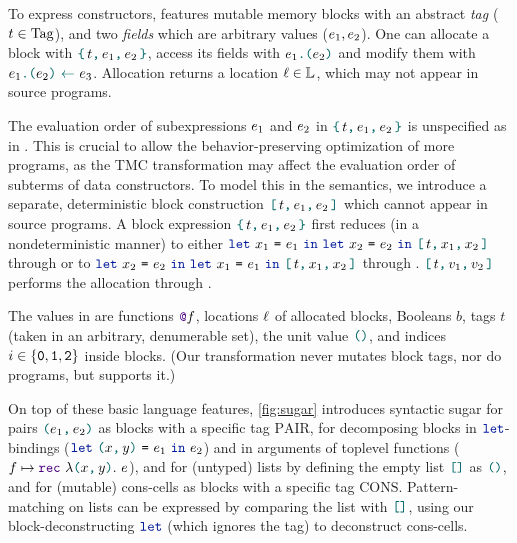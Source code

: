 To express constructors, \DataLang features mutable memory blocks with an abstract \emph{tag} ($\datalangTag \in \datalangTag[]$), and two \emph{fields} which are arbitrary values ($\datalangExpr_1, \datalangExpr_2$).
One can allocate a block with $\datalangBlock{\datalangTag}{\datalangExpr_1}{\datalangExpr_2}$, access its fields with $\datalangLoad{\datalangExpr_1}{\datalangExpr_2}$ and modify them with $\datalangStore{\datalangExpr_1}{\datalangExpr_2}{\datalangExpr_3}$.
Allocation returns a location $\datalangLoc \in \datalangLoc[]$, which may not appear in source programs.

The evaluation order of subexpressions $\datalangExpr_1$ and $\datalangExpr_2$ in $\datalangBlock{\datalangTag}{\datalangExpr_1}{\datalangExpr_2}$ is unspecified as in \OCaml.
This is crucial to allow the behavior-preserving optimization of more programs, as the TMC transformation may affect the evaluation order of subterms of data constructors.
To model this in the semantics, we introduce a separate, deterministic block construction $\datalangBlockDet{\datalangTag}{\datalangExpr_1}{\datalangExpr_2}$ which cannot appear in source programs.
A block expression $\datalangBlock{\datalangTag}{\datalangExpr_1}{\datalangExpr_2}$
first reduces (in a nondeterministic manner)
to either $\datalangLet{\datalangVar_1}{\datalangExpr_1}{\datalangLet{\datalangVar_2}{\datalangExpr_2}{\datalangBlockDet{\datalangTag}{\datalangVar_1}{\datalangVar_2}}}$ through 
or to $\datalangLet{\datalangVar_2}{\datalangExpr_2}{\datalangLet{\datalangVar_1}{\datalangExpr_1}{\datalangBlockDet{\datalangTag}{\datalangVar_1}{\datalangVar_2}}}$ through .
$\datalangBlockDet{\datalangTag}{\datalangVal_1}{\datalangVal_2}$ performs the allocation through .

The values in \DataLang are functions $\datalangFnptr{\datalangFn}$, locations $\datalangLoc$ of allocated blocks, Booleans $b$, tags $t$ (taken in an arbitrary, denumerable set), the unit value $\datalangUnit$, and indices $i \in \{\texttt{0}, \texttt{1}, \texttt{2}\}$ inside blocks. (Our transformation never mutates block tags, nor do \OCaml programs, but \Mezzo supports it.)

On top of these basic language features, \cref{fig:sugar} introduces syntactic sugar for pairs $\datalangPair {\datalangExpr_1} {\datalangExpr_2}$ as blocks with a specific tag $\mathrm{PAIR}$, for decomposing blocks in $\term{\color{datalangKeyword1}{let}}$-bindings ($\datalangLet {\datalangPair \datalangVar \datalangVarTwo} {\datalangExpr_1} {\datalangExpr_2}$) and in arguments of toplevel functions ($\datalangFn \mapsto \datalangRec {\datalangPair \datalangVar \datalangVarTwo} \datalangExpr$), and for (untyped) lists by defining the empty list $\datalangNil$ as $\datalangUnit$, and for (mutable) cons-cells as blocks with a specific tag $\mathrm{CONS}$. Pattern-matching on lists can be expressed by comparing the list with $\datalangNil$, using our block-deconstructing $\term{\color{datalangKeyword1}{let}}$ (which ignores the tag) to deconstruct cons-cells.

